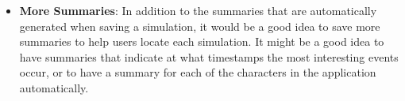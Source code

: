 \begin{itemize}
	\item \textbf{More Summaries}: In addition to the summaries that are automatically generated when saving a simulation, it would be a good idea to save more summaries to help users locate each simulation. It might be a good idea to have summaries that indicate at what timestamps the most interesting events occur, or to have a summary for each of the characters in the application automatically.
	
\end{itemize}


